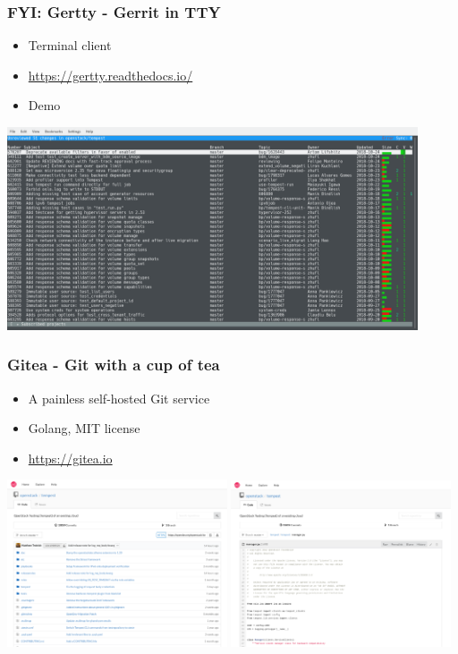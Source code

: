 \documentclass[aspectratio=169,11pt,hyperref={colorlinks=true}]{beamer}
\begin{document}
\begin{frame}
  \frametitle{FYI: Gertty - Gerrit in TTY }
  \begin{itemize}
    \item Terminal client
    \item \url{https://gertty.readthedocs.io/}
    \item Demo
  \end{itemize}
  \centering
  \includegraphics[height=60mm]{images/gertty.png}
\end{frame}

\begin{frame}
  \frametitle{Gitea - Git with a cup of tea}
  \begin{itemize}
    \item A painless self-hosted Git service
    \item Golang, MIT license
    \item \url{https://gitea.io}
  \end{itemize}
  \centering
  \includegraphics[width=65mm]{images/gitea-tempest.png}
  \includegraphics[width=65mm]{images/gitea-tempest-manager.png}
\end{frame}
\end{document}
